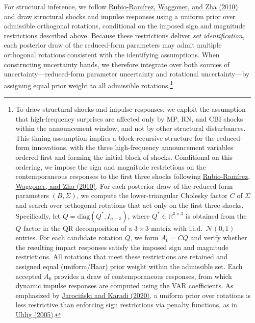 \documentclass[\latexroot/\projectname]{subfiles}
\begin{document}
For structural inference, we follow \hyperlink{Rubio-Ramirez et al. (2010)}{Rubio-Ramírez, Waggoner, and Zha (2010)} and draw structural shocks and impulse responses using a uniform prior over admissible orthogonal rotations, conditional on the imposed sign and magnitude restrictions described above. Because these restrictions deliver \emph{set identification}, each posterior draw of the reduced-form parameters may admit multiple orthogonal rotations consistent with the identifying assumptions. When constructing uncertainty bands, we therefore integrate over both sources of uncertainty—reduced-form parameter uncertainty and rotational uncertainty—by assigning equal prior weight to all admissible rotations.\footnote{To draw structural shocks and impulse responses, we exploit the assumption that high-frequency  surprises are affected only by MP, RN, and CBI shocks within the announcement window, and not by other structural disturbances. This timing assumption implies a block-recursive structure for the reduced-form innovations, with the three high-frequency announcement variables ordered first and forming the initial block of shocks. Conditional on this ordering, we impose the sign and magnitude restrictions on the contemporaneous responses to the first three shocks following \hyperlink{Rubio-Ramirez et al. (2010)}{Rubio-Ramírez, Waggoner, and Zha (2010)}. For each posterior draw of the reduced-form parameters $(B,\Sigma)$, we compute the lower-triangular Cholesky factor $C$ of $\Sigma$ and search over orthogonal rotations that act only on the first three shocks. Specifically, let $Q=\mathrm{diag}(Q^{\ast}, I_{n-3})$, where $Q^{\ast}\in\mathbb{R}^{3\times3}$ is obtained from the $Q$ factor in the QR decomposition of a $3\times3$ matrix with i.i.d.\ $\mathcal{N}(0,1)$ entries. For each candidate rotation $Q$, we form $A_0 = C Q$ and verify whether the resulting impact responses satisfy the imposed sign and magnitude restrictions. All rotations that meet these restrictions are retained and assigned equal (uniform/Haar) prior weight within the admissible set. Each accepted $A_0$ provides a draw of contemporaneous responses, from which dynamic impulse responses are computed using the VAR coefficients. As emphasized by \hyperlink{Jarociński and Karadi (2020)}{Jarociński and Karadi (2020)}, a uniform prior over rotations is less restrictive than enforcing sign restrictions via penalty functions, as in \hyperlink{Uhlig (2005)}{Uhlig (2005)}.}
\end{document}
